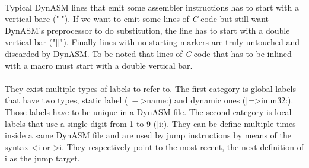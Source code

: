 \\
Typical DynASM lines that emit some assembler instructions has to start with a
vertical bare ("$\vert$"). If we want to emit some lines of \emph{C} code but
still want DynASM's preprocessor to do substitution, the line has to start with a double vertical bar ("$\vert\vert$"). Finally lines with no starting markers are
truly untouched and discarded by DynASM. To be noted that lines of \emph{C} code that
has to be inlined with a macro must start with a double vertical bar. \\

\\
They exist multiple types of labels to refer to. The first category is global
labels that have two types, static label ($\vert-$\textgreater name:) and dynamic ones ($\vert$=\textgreater imm32:).
Those labels have to be unique in a DynASM file. The second category is local
labels that use a single digit from 1 to 9 ($\vert$i:). They can be define
multiple times inside a same DynASM file and are used by jump instructions by
means of the syntax \textless i or \textgreater i. They respectively point to
the most recent, the next definition of i as the jump target.
